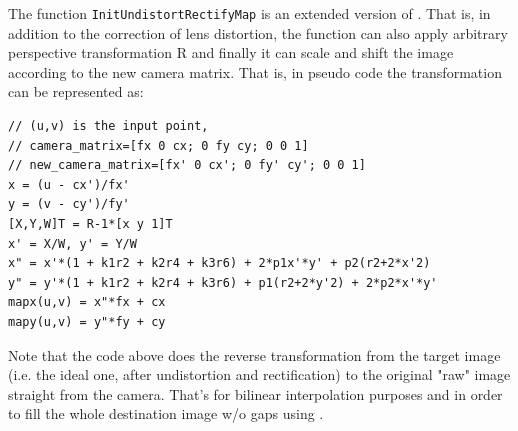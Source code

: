 
\begin{description}
\end{description}

The function \texttt{InitUndistortRectifyMap} is an extended version of . That is, in addition to the correction of lens distortion, the function can also apply arbitrary perspective transformation R and finally it can scale and shift the image according to the new camera matrix. That is, in pseudo code the transformation can be represented as:

\begin{lstlisting}
// (u,v) is the input point,
// camera_matrix=[fx 0 cx; 0 fy cy; 0 0 1]
// new_camera_matrix=[fx' 0 cx'; 0 fy' cy'; 0 0 1]
x = (u - cx')/fx'
y = (v - cy')/fy'
[X,Y,W]T = R-1*[x y 1]T
x' = X/W, y' = Y/W
x" = x'*(1 + k1r2 + k2r4 + k3r6) + 2*p1x'*y' + p2(r2+2*x'2)
y" = y'*(1 + k1r2 + k2r4 + k3r6) + p1(r2+2*y'2) + 2*p2*x'*y'
mapx(u,v) = x"*fx + cx
mapy(u,v) = y"*fy + cy
\end{lstlisting}

Note that the code above does the reverse transformation from the target image (i.e. the ideal one, after undistortion and rectification) to the original "raw" image straight from the camera. That's for bilinear interpolation purposes and in order to fill the whole destination image w/o gaps using .\
 
